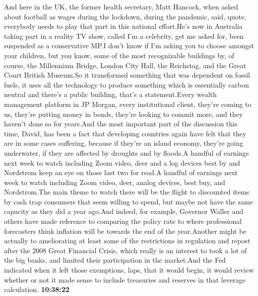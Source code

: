 \documentclass{article}%
\begin{document}
And here in the UK, the former health secretary, Matt Hancock, when asked about football as wages during the lockdown, during the pandemic, said, quote, everybody needs to play that part in this national effort.He's now in Australia taking part in a reality TV show, called I'm a celebrity, get me asked for, been suspended as a conservative MP.I don't know if I'm asking you to choose amongst your children, but you know, some of the most recognizable buildings by, of course, the Millennium Bridge, London City Hall, the Reichstag, and the Great Court British Museum.So it transformed something that was dependent on fossil fuels, it uses all the technology to produce something which is essentially carbon neutral and there's a public building, that's a statement.Every wealth management platform in JP Morgan, every institutional client, they're coming to us, they're putting money in bonds, they're looking to commit more, and they haven't done so for years.And the most important part of the discussion this time, David, has been a fact that developing countries again have felt that they are in some cases suffering, because if they're an island economy, they're going underwater, if they are affected by droughts and by floods.A handful of earnings next week to watch including Zoom video, deer and a log devices best by and Nordstrom keep an eye on those last two for read.A handful of earnings next week to watch including Zoom video, deer, analog devices, best buy, and Nordstrom.The main theme to watch there will be the flight to discounted items by cash trap consumers that seem willing to spend, but maybe not have the same capacity as they did a year ago.And indeed, for example, Governor Waller and others have made reference to comparing the policy rate to where professional forecasters think inflation will be towards the end of the year.Another might be actually to ameliorating at least some of the restrictions in regulation and repost after the 2008 Great Financial Crisis, which really is an interest to took a lot of the big banks, and limited their participation in the market.And the Fed indicated when it left those exemptions, laps, that it would begin, it would review whether or not it made sense to include treasuries and reserves in that leverage calculation.%
\textbf{10:38:22}%
\newline%
\end{document}
